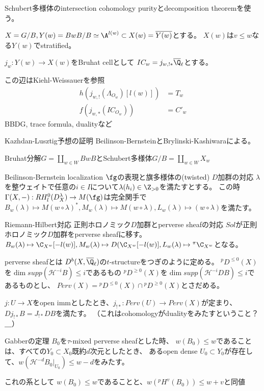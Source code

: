 \documentclass[dvipdfmx]{beamer}
\begin{document}
\begin{frame}{Schubert多様体のintersection cohomology}
  purityとdecomposition theoremを使う。

  $X=G/B, Y(w)=BwB/B\simeq \A^{l(w)}\subset X(w)=\overline{Y(w)}$とする。
  $X(w)$は$v\leq w$なる$Y(w)$でstratified。

  $j_w:Y(w) \to X(w)$をBruhat cellとして
  $IC_w=j_{w,!*}\overline{\Q}_\ell$とする。

  この辺はKiehl-Weissauerを参照
  \begin{align*}
    h(j_{w,!}(\Lambda_{O_w})[l(w)])&=T_w\\
    f(j_{w,*}(IC_{O_w}))&=C'_w
  \end{align*}
  BBDG, trace formula, dualityなど
\end{frame}

\begin{frame}{Kazhdan-Lusztig予想の証明}
  Beilinson-BernsteinとBrylinski-Kashiwaraによる。

  Bruhat分解$G=\coprod_{w\in W}BwB$とSchubert多様体$G/B=\coprod_{w\in W}X_w$

  Beilinson-Bernstein localization
  $\fg$の表現と旗多様体の(twisted) $D$加群の対応
  $\lambda$を整ウェイトで任意の$i\in I$について$\lambda(h_i)\in\Z_{>0}$を満たすとする。
  この時$\Gamma(X,-):RH^0_l(D^\lambda_X) \to M(\fg)$は完全関手で
  $B_w(\lambda)\mapsto M(w\circ\lambda)^*, M_w(\lambda)\mapsto M(w\circ\lambda), L_w(\lambda)\mapsto(w\circ\lambda)$を満たす。

  Riemann-Hilbert対応
  正則ホロノミック$D$加群とperverse sheafの対応
  $Sol$が正則ホロノミック$D$加群をperverse sheafに移す。
  $B_w(\lambda)\mapsto \C_{X^w}[-l(w)], M_w(\lambda)\mapsto D(\C_{X^w}[-l(w)],L_w(\lambda)\mapsto {}^\pi\C_{X^w}$となる。
\end{frame}

\begin{frame}{perverse sheafとは}
  $D^b(X,\overline{\Q}_\ell)$の$t$-structureをつぎのように定める。
  ${}^pD^{\leq0}(X)$を$\dim supp(\mathcal{H}^{-i}B)\leq i$であるもの
  ${}^pD^{\geq0}(X)$を$\dim supp(\mathcal{H}^{-i}DB)\leq i$であるものとし、
  $Perv(X)={}^pD^{\leq0}(X)\cap{}^pD^{\geq0}(X)$とさだめる。

  $j:U \to X$をopen immとしたとき、$j_{!*}:Perv(U) \to Perv(X)$が定まり、
  $Dj_{!*}B=J_{!*}DB$を満たす。
  （これはcohomologyがdualityをみたすということ？＿）

  Gabberの定理
  $B_0$を$\tau$-mixed perverse sheafとした時、
  $w(B_0)\leq w$であることは、すべての$Y_0\subset X_0$既約$d$次元としたとき、
  あるopen dense $U_0\subset Y_0$が存在して、$w(\mathcal{H}^{-d}B_0\vert_{U_0})\leq w-d$をみたす。

  これの系として
  $w(B_0)\leq w$であることと、$w({}^pH^v(B_0))\leq w+v$と同値
\end{frame}
\end{document}

